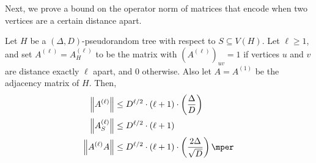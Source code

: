 \documentclass[11pt,letterpaper]{article}
\begin{document}
    Next, we prove a bound on the operator norm of matrices that encode when two vertices are a certain distance apart. 

    \begin{lemma}
        \label{lem:trace-method-best-method}
        Let $H$ be a $(\Delta,D)$-pseudorandom tree with respect to $S \subseteq V(H)$. Let $\ell \ge 1$, and set $A^{(\ell)} = A^{(\ell)}_H$ to be the matrix with $(A^{(\ell)})_{uv} = 1$ if vertices $u$ and $v$ are distance exactly $\ell$ apart, and $0$ otherwise. Also let $A = A^{(1)}$ be the adjacency matrix of $H$. Then,
        \begin{align*}
            \left\| A^{(\ell)} \right\| &\le D^{\ell/2} \cdot (\ell+1) \cdot \left( \frac{\Delta}{D} \right) \\
            \left\| A^{(\ell)}_S \right\| &\le D^{\ell/2} \cdot (\ell+1) \\
            \left\| A^{(\ell)} A \right\| &\le D^{\ell/2} \cdot (\ell+1) \cdot \left( \frac{2\Delta}{\sqrt{D}} \right) \mper
        \end{align*}
    \end{lemma}
\end{document}
